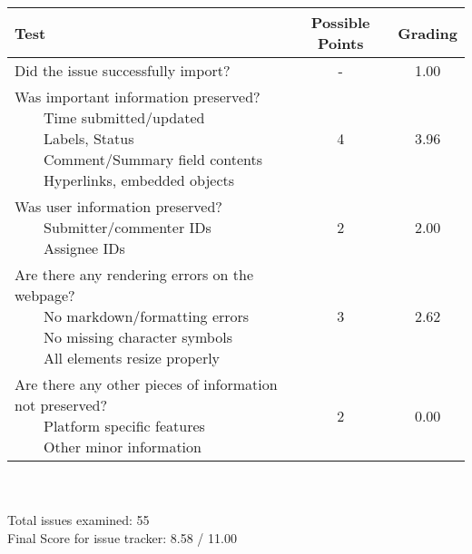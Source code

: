 \documentclass{article}
\newcommand{\tabitem}{~~\llap{\textbullet}~~}
\begin{document}
\begin{adjustbox}{center}
	\renewcommand{\arraystretch}{1.5}
	\begin{tabular}{ p{6cm} | c | c }
		Test & Possible Points & Grading \\ \hline
		Did the issue successfully import? & - & 1.00 \\
		\hline
		\makecell[l]{
			Was important information preserved? \\
			\tabitem Time submitted/updated \\
			\tabitem Labels, Status \\
			\tabitem Comment/Summary field contents \\
			\tabitem Hyperlinks, embedded objects}
		& 4 & 3.96 \\
		\hline
		\makecell[l]{
			Was user information preserved? \\
			\tabitem Submitter/commenter IDs \\
			\tabitem Assignee IDs
		} & 2 & 2.00 \\
		\hline
		\makecell[{{p{6cm}}}]{
			Are there any rendering errors on the webpage? \\
			\tabitem No markdown/formatting errors \\
			\tabitem No missing character symbols \\
			\tabitem All elements resize properly
		} & 3 & 2.62 \\
		\hline
		\makecell[{{p{6cm}}}]{
			Are there any other pieces of information not preserved? \\
			\tabitem Platform specific features \\
			\tabitem Other minor information
		} & 2 & 0.00 \\
	\end{tabular}
\end{adjustbox}
\\
\\Total issues examined: 55\\Final Score for issue tracker: 8.58 / 11.00 \\ \\\begin{adjustbox}{center}
\end{adjustbox}
\\
\end{document}
